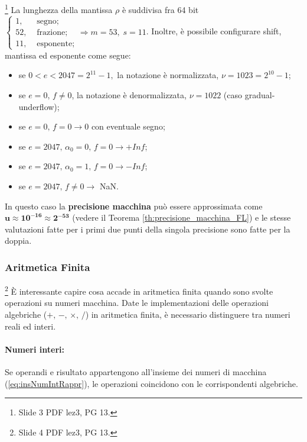 \begin{definition}\footnote{Slide 3 PDF lez3, PG 13.}
	La lunghezza della mantissa $\rho$ è suddivisa fra 64 bit $\begin{cases}
		1, &\text{ segno};\\
		52, &\text{ frazione};\\
		11, &\text{ esponente};
	\end{cases}\Rightarrow m=53,\; s=11$.
	Inoltre, è possibile configurare shift, mantissa ed esponente come segue:
	\begin{itemize}
		\item se $0<e<2047=2^{11}-1,$ la notazione è normalizzata, $\nu=1023=2^{10}-1$;
		\item se $e=0,\,f\neq 0$, la notazione è denormalizzata, $\nu=1022$ (caso gradual-underflow);
		\item se $e=0,\,f=0\rightarrow 0$ con eventuale segno;
		\item se $e=2047,\,\alpha_0=0,\,f=0\rightarrow +Inf$;
		\item se $e=2047,\,\alpha_0=1,\,f=0\rightarrow -Inf$;
		\item se $e=2047,\,f\neq 0 \rightarrow$ NaN.
	\end{itemize}
\end{definition}

\begin{remark}
	In questo caso la \textbf{precisione macchina} può essere approssimata come $\boldsymbol{u\approx 10^{-16}\approx 2^{-53}}$ (vedere il Teorema \ref{th:precisione_macchina_FL}) e le stesse valutazioni fatte per i primi due punti della singola precisione sono fatte per la doppia.
\end{remark}

\subsubsection{Aritmetica Finita}\footnote{Slide 4 PDF lez3, PG 13.}
È interessante capire cosa accade in aritmetica finita quando sono svolte operazioni su numeri macchina. Date le implementazioni delle operazioni algebriche ($+,\, -,\,\times,\, \slash$) in aritmetica finita, è necessario distinguere tra numeri reali ed interi.

\paragraph{Numeri interi:} Se operandi e risultato appartengono all'insieme dei numeri di macchina (\ref{eq:insNumIntRappr}), le operazioni coincidono con le corrispondenti algebriche.

